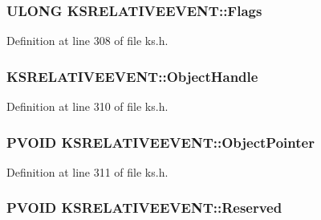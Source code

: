 \subsubsection[{\texorpdfstring{Flags}{Flags}}]{\setlength{\rightskip}{0pt plus 5cm}U\+L\+O\+NG K\+S\+R\+E\+L\+A\+T\+I\+V\+E\+E\+V\+E\+N\+T\+::\+Flags}\hypertarget{struct_k_s_r_e_l_a_t_i_v_e_e_v_e_n_t_ad139d9b8be7a60c347ba6ca839c220fa}{}\label{struct_k_s_r_e_l_a_t_i_v_e_e_v_e_n_t_ad139d9b8be7a60c347ba6ca839c220fa}


Definition at line 308 of file ks.\+h.

\subsubsection[{\texorpdfstring{Object\+Handle}{ObjectHandle}}]{ K\+S\+R\+E\+L\+A\+T\+I\+V\+E\+E\+V\+E\+N\+T\+::\+Object\+Handle}\hypertarget{struct_k_s_r_e_l_a_t_i_v_e_e_v_e_n_t_ad9a2b661ef1c4b4cf80d98e87514e881}{}\label{struct_k_s_r_e_l_a_t_i_v_e_e_v_e_n_t_ad9a2b661ef1c4b4cf80d98e87514e881}


Definition at line 310 of file ks.\+h.

\subsubsection[{\texorpdfstring{Object\+Pointer}{ObjectPointer}}]{\setlength{\rightskip}{0pt plus 5cm}P\+V\+O\+ID K\+S\+R\+E\+L\+A\+T\+I\+V\+E\+E\+V\+E\+N\+T\+::\+Object\+Pointer}\hypertarget{struct_k_s_r_e_l_a_t_i_v_e_e_v_e_n_t_a8460e7d6dccd09980ddc5389cfbcf697}{}\label{struct_k_s_r_e_l_a_t_i_v_e_e_v_e_n_t_a8460e7d6dccd09980ddc5389cfbcf697}


Definition at line 311 of file ks.\+h.

\subsubsection[{\texorpdfstring{Reserved}{Reserved}}]{\setlength{\rightskip}{0pt plus 5cm}P\+V\+O\+ID K\+S\+R\+E\+L\+A\+T\+I\+V\+E\+E\+V\+E\+N\+T\+::\+Reserved}\hypertarget{struct_k_s_r_e_l_a_t_i_v_e_e_v_e_n_t_a86e6d25d595e9871a1a4895760ea4276}{}\label{struct_k_s_r_e_l_a_t_i_v_e_e_v_e_n_t_a86e6d25d595e9871a1a4895760ea4276}


